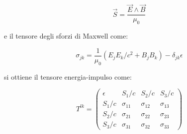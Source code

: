 \documentclass{article}
\begin{document}
\begin{equation}
    \vec{S}=\frac{\vec{E}\wedge\vec{B}}{\mu_0}
\end{equation}

e il tensore degli sforzi di Maxwell come:

\begin{equation}
    \sigma_{jk}=\frac{1}{\mu_0}(E_jE_k/c^2+B_jB_k)-\delta_{jk}\epsilon
\end{equation}

si ottiene il tensore energia-impulso come:

\begin{equation}
    T^{lk}=
    \begin{pmatrix}
    \epsilon & S_1/c & S_2/c & S_3/c \\
    S_1/c & \sigma_{11} & \sigma_{12} & \sigma_{13} \\
    S_2/c & \sigma_{21} & \sigma_{22} & \sigma_{23} \\
    S_3/c & \sigma_{31} & \sigma_{32} & \sigma_{33}
    \end{pmatrix}
\end{equation}
\end{document}
